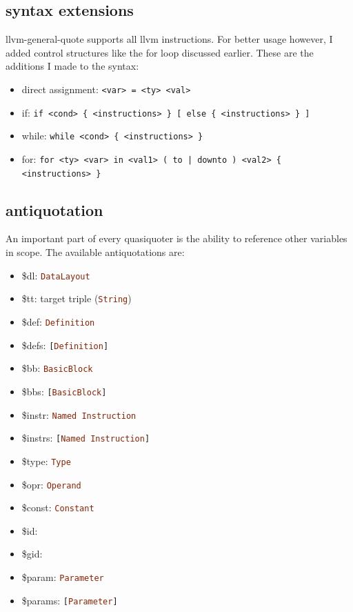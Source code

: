 \documentclass[a4paper,bibliography=totocnumbered,parskip,headsepline]{scrbook}
\begin{document}
\subsection{syntax extensions}
llvm-general-quote supports all llvm instructions.
For better usage however, I added control structures like the for loop discussed earlier.
These are the additions I made to the syntax:
\begin{itemize}
 \item direct assignment: \lstinline!<var> = <ty> <val>!
 \item if: \lstinline!if <cond> { <instructions> } [ else { <instructions> } ]!
 \item while: \lstinline!while <cond> { <instructions> }!
 \item for: \lstinline!for <ty> <var> in <val1> ( to | downto ) <val2> { <instructions> }!
\end{itemize}

\subsection{antiquotation}
An important part of every quasiquoter is the ability to reference other variables in scope.
The available antiquotations are:
\begin{itemize}
\item \$dl: \lstinline[language=haskell]!DataLayout!
\item \$tt: target triple (\lstinline[language=haskell]!String!)
\item \$def: \lstinline[language=haskell]!Definition!
\item \$defs: \lstinline[language=haskell]![Definition]!
\item \$bb: \lstinline[language=haskell]!BasicBlock!
\item \$bbs: \lstinline[language=haskell]![BasicBlock]!
\item \$instr: \lstinline[language=haskell]!Named Instruction!
\item \$instrs: \lstinline[language=haskell]![Named Instruction]!
\item \$type: \lstinline[language=haskell]!Type!
\item \$opr: \lstinline[language=haskell]!Operand!
\item \$const: \lstinline[language=haskell]!Constant!
\item \$id: 
\item \$gid: 
\item \$param: \lstinline[language=haskell]!Parameter!
\item \$params: \lstinline[language=haskell]![Parameter]!
\end{itemize}
\end{document}
